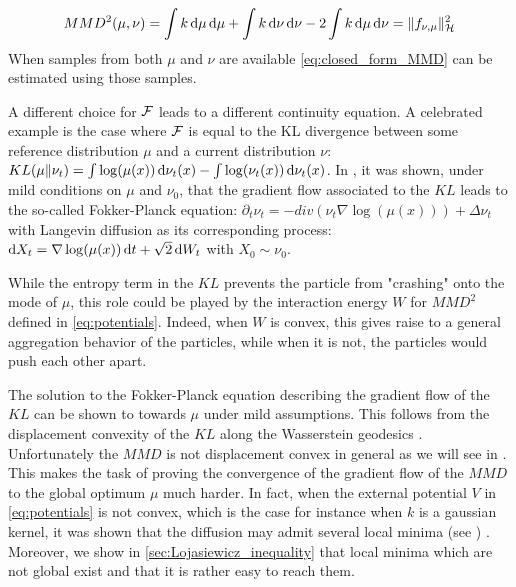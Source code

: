 \begin{align}\label{eq:closed_form_MMD}
MMD^2(\mu,\nu) = \int k\mathop{}\!\mathrm{d}\mu \mathop{}\!\mathrm{d}\mu + \int k\mathop{}\!\mathrm{d}\nu \mathop{}\!\mathrm{d} \nu - 2\int k\mathop{}\!\mathrm{d}\mu \mathop{}\!\mathrm{d} \nu=\Vert f_{\nu,\mu} \Vert^2_{\mathcal{H}} 
\end{align}
When samples from both $\mu$ and $\nu$ are available \cref{eq:closed_form_MMD} can be estimated using those samples. 
\begin{remark}
A different choice for ${{\mathcal F}}$  leads to a different continuity equation. A celebrated example is the case where ${{\mathcal F}}$ is equal to the KL divergence between some reference distribution $\mu$ and a current distribution $\nu$: $KL(\mu\Vert \nu_t ) =  \int \log (\mu(x))\mathop{}\!\mathrm{d} \nu_t(x) -\int \log(\nu_t(x))\mathop{}\!\mathrm{d} \nu_t(x)$. In \cite{jordan1998variational}, it was shown, under mild conditions on $\mu$ and $\nu_0$, that the gradient flow associated to the $KL$ leads to the so-called Fokker-Planck equation: $ \partial_t \nu_t = - div(\nu_t \nabla \log(\mu(x))) + \Delta \nu_t $ with Langevin diffusion as its corresponding process: $\mathop{}\!\mathrm{d} X_t = \nabla \log(\mu(x))\mathop{}\!\mathrm{d} t + \sqrt{2} \mathop{}\!\mathrm{d} W_t $ with $X_0\sim \nu_0$.
 
 While the entropy term in the $KL$ prevents the particle from "crashing" onto the mode of $\mu$, this role could be played by the interaction energy $W$ for $MMD^2$ defined in \cref{eq:potentials}. Indeed, when $W$ is convex, this gives raise to a general aggregation behavior of the particles, while when it is not, the particles would push each other apart.  

The solution to the Fokker-Planck equation describing the gradient flow of the $KL$ can be shown to towards $\mu$ under mild assumptions. This follows from the displacement convexity of the $KL$ along the Wasserstein geodesics . Unfortunately the $MMD$ is not displacement convex in general as we will see in . This makes the task of proving the convergence of the gradient flow of the $MMD$ to the global optimum $\mu$ much harder. In fact, when the external potential $V$ in \cref{eq:potentials} is not convex, which is the case for instance when $k$ is a gaussian kernel, it was shown that the diffusion may admit several local minima (see \cite{herrmann2010non,tugaut2014phase}) . Moreover, we show in \cref{sec:Lojasiewicz_inequality} that local minima which are not global exist and that it is rather easy to reach them.
\end{remark}

